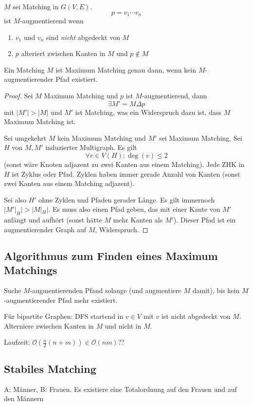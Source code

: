 \documentclass[11pt]{scrbook}
\begin{document}
\begin{df}
$M$ sei Matching in $G(V,E)$.
\[
p=v_1\dotsb v_n
\]
ist $M$-augmentierend wenn
\begin{enumerate}
\item $v_1$ und $v_n$ sind \emph{nicht} abgedeckt von $M$
\item $p$ alteriert zwischen Kanten in $M$ und $p\not \in M$ 
\end{enumerate}

\end{df}

\begin{thm}[Bergel, 1957]
Ein Matching $M$ ist Maximum Matching genau dann, wenn kein $M$-augmentierender Pfad existiert.
\begin{proof}
Sei $M$ Maximum Matching und $p$ ist $M$-augmentierend, dann
\[
\exists M'=M\Delta p
\]
mit $|M'|>|M|$ und $M'$ ist Matching, was ein Widerspruch dazu ist, dass $M$ Maximum Matching ist.

Sei umgekehrt $M$ kein Maximum Matching und $M'$ sei Maximum Matching.
Sei $H$ von $M, M'$ induzierter Multigraph.
Es gilt
\[
\forall v\in V(H):\deg(v)\le 2
\]
(sonst wäre Knoten adjazent zu zwei Kanten aus einem Matching).
Jede ZHK in $H$ ist Zyklus oder Pfad.
Zyklen haben immer gerade Anzahl von Kanten (sonst zwei Kanten aus einem Matching adjazent).

Sei also $H'$ ohne Zyklen und Pfaden gerader Länge.
Es gilt immernoch $|M'|_H|>|M|_H|$.
Es muss also einen Pfad geben, das mit einer Kante von $M'$ anfängt und aufhört (sonst hätte $M$ mehr Kanten als $M'$).
Dieser Pfad ist ein augmentierender Graph auf $M$, Widerspruch.
\end{proof}
\end{thm}

\subsection{Algorithmus zum Finden eines Maximum Matchings}

Suche $M$-augmentierenden Pfand solange (und augmentiere $M$ damit), bis kein $M$-augmentierender Pfad mehr existiert.

Für bipartite Graphen:
DFS startend in $v\in V$ mit $v$ ist nicht abgedeckt von $M$.
Alterniere zwischen Kanten in $M$ und nicht in $M$.

Laufzeit: $\mathcal O(\frac n2(n+m)) \in \mathcal O(nm)$??

\subsection{Stabiles Matching}
A: Männer, B: Frauen.
Es existiere eine Totalordnung auf den Frauen und auf den Männern
\end{document}
